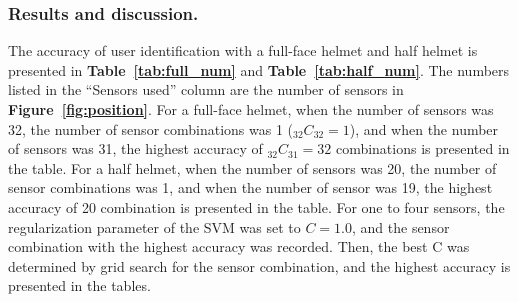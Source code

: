 \documentclass[sigchi,authordraft]{acmart}
\newcommand\figref[1]{\textbf{Figure~\ref{fig:#1}}}
\newcommand\tabref[1]{\textbf{Table~\ref{tab:#1}}}
\begin{document}





\subsubsection{Results and discussion.}
The accuracy of user identification with a full-face helmet and half helmet is presented in \tabref{full_num} and \tabref{half_num}. The numbers listed in the ``Sensors used'' column are the number of sensors in \figref{position}. For a full-face helmet, when the number of sensors was 32, the number of sensor combinations was 1 ($_{32}C_{32}=1$), and when the number of sensors was 31, the highest accuracy of $_{32}C_{31}=32$ combinations is presented in the table. For a half helmet, when the number of sensors was 20, the number of sensor combinations was 1, and when the number of sensor was 19, the highest accuracy of 20 combination is presented in the table. For one to four sensors, the regularization parameter of the SVM was set to $C=1.0$, and the sensor combination with the highest accuracy was recorded. Then, the best C was determined by grid search for the sensor combination, and the highest accuracy is presented in the tables.\par
\end{document}
